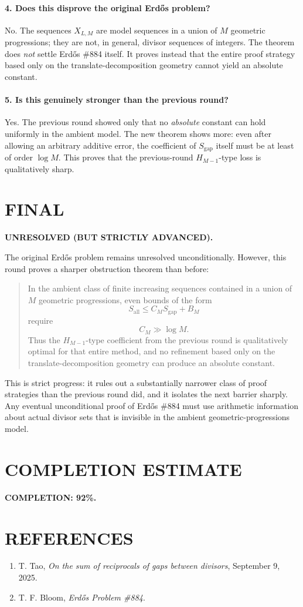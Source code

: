 \paragraph{4. Does this disprove the original Erd\H{o}s problem?}
No. The sequences \(X_{L,M}\) are model sequences in a union of \(M\) geometric progressions; they are not, in general, divisor sequences of integers. The theorem does \emph{not} settle Erd\H{o}s \#884 itself. It proves instead that the entire proof strategy based only on the translate-decomposition geometry cannot yield an absolute constant.

\paragraph{5. Is this genuinely stronger than the previous round?}
Yes. The previous round showed only that no \emph{absolute} constant can hold uniformly in the ambient model. The new theorem shows more: even after allowing an arbitrary additive error, the coefficient of \(S_{\mathrm{gap}}\) itself must be at least of order \(\log M\). This proves that the previous-round \(H_{M-1}\)-type loss is qualitatively sharp.

\section{FINAL}

\textbf{UNRESOLVED (BUT STRICTLY ADVANCED).}

The original Erd\H{o}s problem remains unresolved unconditionally. However, this round proves a sharper obstruction theorem than before:

\begin{quote}
In the ambient class of finite increasing sequences contained in a union of \(M\) geometric progressions, even bounds of the form
\[
S_{\mathrm{all}}\le C_M S_{\mathrm{gap}}+B_M
\]
require
\[
C_M\gg \log M.
\]
Thus the \(H_{M-1}\)-type coefficient from the previous round is qualitatively optimal for that entire method, and no refinement based only on the translate-decomposition geometry can produce an absolute constant.
\end{quote}

This is strict progress: it rules out a substantially narrower class of proof strategies than the previous round did, and it isolates the next barrier sharply. Any eventual unconditional proof of Erd\H{o}s \#884 must use arithmetic information about actual divisor sets that is invisible in the ambient geometric-progressions model.

\section{COMPLETION ESTIMATE}

\noindent \textbf{COMPLETION: 92\%.}

\section{REFERENCES}

\begin{enumerate}
\item T. Tao, \emph{On the sum of reciprocals of gaps between divisors}, September 9, 2025.
\item T. F. Bloom, \emph{Erd\H{o}s Problem \#884}.
\end{enumerate}
